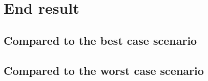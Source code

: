 \documentclass[a4paper,12pt]{article}
\begin{document}
\newpage
\section{End result}
\subsection{Compared to the best case scenario}

\subsection{Compared to the worst case scenario}


\newpage
{}
{}
\listoffigures

\newpage
{}
{}


\end{document}
